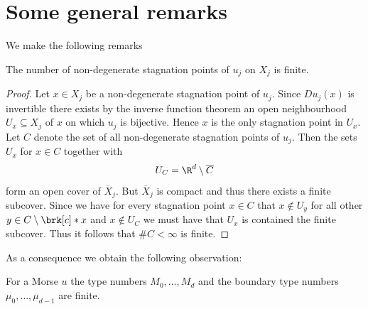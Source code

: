 

\chapter{Some general remarks}

We make the following remarks
\begin{proposition}\label{pr:finiteness_critical_points}
  The number of non-degenerate
  stagnation points of $u_j$ on $X_j$ is finite.
\end{proposition}
\begin{proof}
  Let $x\in X_j$ be a non-degenerate stagnation point of $u_j$. Since $Du_j(x)$ is invertible there exists
  by the inverse function theorem an open neighbourhood $U_x\subseteq X_j$ of $x$ on which 
  $u_j$ is bijective. Hence $x$ is the only stagnation point in $U_x$. Let $C$ denote the set of all
  non-degenerate stagnation points of $u_j$. Then the sets $U_x$ for $x\in C$ together with
  \begin{align}
    U_C=\R^d\setminus \overline{C}
  \end{align}
  form an open cover of $\overline{X}_j$. But $\overline{X}_j$ is compact and thus there exists
  a finite subcover. Since we have for every stagnation point $x\in C$ that
  $x\not\in U_y$ for all other $y\in C\setminus\brk[c]*{x}$ and $x\not\in U_C$ we must have that $U_x$
  is contained the finite subcover. Thus it follows that $\#C<\infty$ is finite.
\end{proof}
As a consequence we obtain the following observation:
\begin{corollary}
  For a Morse $u$ the type numbers $M_0,\dots,M_d$ and the boundary type numbers $\mu_0,\dots,\mu_{d-1}$
  are finite.
\end{corollary}

